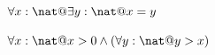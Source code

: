 \documentclass[a4paper,10pt,fleqn]{article}
\begin{document}
\noindent
$\forall x : \nat @ \exists y : \nat @ x = y$


\noindent
$\forall x : \nat @ x > 0 \land (\forall y : \nat @ y > x)$
\end{document}
